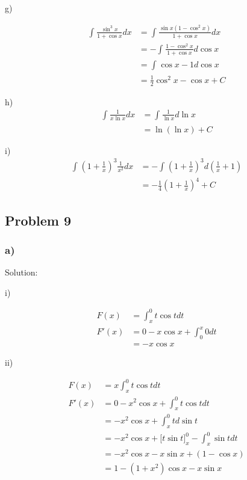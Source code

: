 \documentclass[letterpaper, 11pt]{article}
\newcommand{\1}{\mathds{1}}	%
\theoremstyle{definition}
\begin{document}
  g)

  \begin{align*}
    \int_{}^{}\frac{\sin ^{3}x}{1+ \cos x}dx & = \int_{}^{}\frac{\sin x (1- \cos ^{2}x)}{1+\cos x}dx \\
                                             & = -\int_{}^{}\frac{1-\cos ^{2} x}{1+ \cos x} d \cos x \\
                                             & = \int_{}^{}\cos x - 1 d \cos x                       \\
                                             & = \frac{1}{2}\cos ^{2} x - \cos x + C
  \end{align*}


  h)
  \begin{align*}
    \int_{}^{}\frac{1}{x \ln x}dx & = \int_{}^{}\frac{1}{\ln x}d \ln x \\
                                  & =\ln(\ln x) +C
  \end{align*}

  i)
  \begin{align*}
    \int_{}^{}(1+\frac{1}{x})^{3}\frac{1}{x ^{2}} dx & = -\int_{}^{}(1 + \frac{1}{x})^{3}d(\frac{1}{x} + 1) \\
                                                     & = -\frac{1}{4} (1+\frac{1}{x})^{4} + C
  \end{align*}

  \subsection*{Problem 9}

  \subsubsection*{a)}

  Solution:

  i)

  \begin{align*}
    F(x)  & = \int_{x}^{0} t \cos t dt         \\
    F'(x) & = 0 - x \cos x + \int_{0}^{x} 0 dt \\
          & = -x\cos x
  \end{align*}

  ii)

  \begin{align*}
    F(x)  & = x\int_{x}^{0} t \cos t dt                                             \\
    F'(x) & = 0 - x ^{2}\cos x + \int_{x}^{0}t \cos t dt                            \\
          & = -x ^{2} \cos x + \int_{x}^{0}t d \sin t                               \\
          & = -x ^{2} \cos x + \Big[ t \sin t \Big]_{x}^{0} - \int_{x}^{0}\sin t dt \\
          & = -x ^{2} \cos x - x \sin x + (1 - \cos x)                              \\
          & = 1 - (1+x ^{2})\cos x - x \sin x
  \end{align*}
\end{document}
